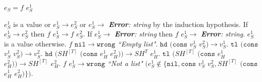 \begin{case}

$e_{S}=f$ $e_{S}^{1}$

$e_{S}^{1}$ is a value or $e_{S}^{1}\rightarrow e_{S}^{2}$ or $e_{S}^{1}\rightarrow$ \emph{\textbf{Error}: string} by the induction hypothesis.  If $e_{S}^{1}\rightarrow e_{S}^{2}$ then $f$ $e_{S}^{1}\rightarrow f$ $e_{S}^{2}$.  If $e_{S}^{1}\rightarrow$ \emph{\textbf{Error}: string} then $f$ $e_{S}^{1}\rightarrow$ \emph{\textbf{Error}: string}.  $e_{S}^{1}$ is a value otherwise.  $f$ $\mathtt{nil}\rightarrow\mathtt{wrong}$ \emph{``Empty list"}.  $\mathtt{hd}$ $(\mathtt{cons}$ $v_{S}^{1}$ $v_{S}^{2})\rightarrow v_{S}^{1}$.  $\mathtt{tl}$ $(\mathtt{cons}$ $v_{S}^{1}$ $v_{S}^{2})\rightarrow v_{S}^{2}$.  $\mathtt{hd}$ $(SH^{[T]}$ $(\mathtt{cons}$ $e_{H}^{1}$ $e_{H}^{2}))\rightarrow SH^{T}$ $e_{H}^{1}$.  $\mathtt{tl}$ $(SH^{[T]}$ $(\mathtt{cons}$ $e_{H}^{1}$ $e_{H}^{2}))\rightarrow SH^{[T]}$ $e_{H}^{2}$.  $f$ $e_{S}^{1}\rightarrow\mathtt{wrong}$ \emph{``Not a list"} $(e_{S}^{1}\not\in\lbrace\mathtt{nil},\mathtt{cons}$ $v_{S}^{1}$ $v_{S}^{2},SH^{[T]}$ $(\mathtt{cons}$ $e_{H}^{1}$ $e_{H}^{2})\rbrace)$.

\end{case}